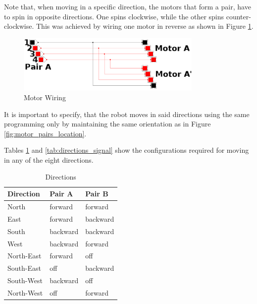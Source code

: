 Note that, when moving in a specific direction,
the motors that form a pair,
have to spin in opposite directions.
One spins clockwise, while the other spins counter-clockwise.
This was achieved by wiring one motor in reverse as shown in Figure \ref{fig:reverse_wiring}.
\begin{figure}[htp]
	\centering
	\includegraphics[width=0.8\textwidth]{figures/move/motor_pairs_cedar.png}
	\caption{Motor Wiring}
	\label{fig:reverse_wiring}
\end{figure}

It is important to specify, that the robot moves in said directions using the same 
programming only by maintaining the same
orientation as in Figure \ref{fig:motor_pairs_location}.

Tables \ref{tab:directions} and \ref{tab:directions_signal} show the configurations 
required for moving in any of the eight directions.
\begin{table}[htp]
	\centering
	\caption{Directions}
	\begin{tabular}{|l|l|l|}
		\hline
		Direction 	& Pair A 	& Pair B	\\
		\hline
		North 		& forward 	& forward \\
		East 		& forward 	& backward \\
		South 		& backward 	& backward \\
		West 		& backward 	& forward \\
		\hline
		North-East 	& forward 	& off \\
		South-East 	& off 		& backward \\
		South-West 	& backward 	& off\\
		North-West 	& off 		& forward \\
		\hline
	\end{tabular}
	\label{tab:directions}
\end{table}

\newpage


